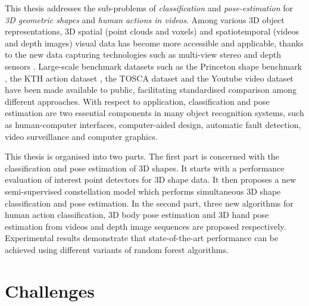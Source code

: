 This thesis addresses the sub-problems of \emph{classification} and \emph{pose-estimation} for \emph{3D geometric shapes} and \emph{human actions in videos}. 
Among various 3D object representations, 3D spatial (\eg point clouds and voxels) and spatiotemporal (\eg videos and depth images) visual data has become more accessible and applicable, thanks to the new data capturing technologies such as multi-view stereo \cite{Vogiatzis2011} and depth sensors \cite{Shotton2011}.  
Large-scale benchmark datasets such as the Princeton shape benchmark \cite{Shilane2004}, the KTH action dataset \cite{Schuldt2004}, the TOSCA dataset \cite{Bronstein2011} and the Youtube video dataset \cite{Liu2009} have been made available to public, facilitating standardised comparison among different approaches.
With respect to application, classification and pose estimation are two essential components in many object recognition systems, such as human-computer interfaces, computer-aided design, automatic fault detection, video surveillance and computer graphics. 

This thesis is organised into two parts.  
The first part is concerned with the classification and pose estimation of 3D shapes. 
It starts with a performance evaluation of interest point detectors for 3D shape data. 
It then proposes a new semi-supervised constellation model which performs simultaneous 3D shape classification and pose estimation. 
In the second part, three new algorithms for human action classification, 3D body pose estimation and 3D hand pose estimation from videos and depth image sequences are proposed respectively. Experimental results demonstrate that state-of-the-art performance can be achieved using different variants of random forest algorithms.  

\section{Challenges}

